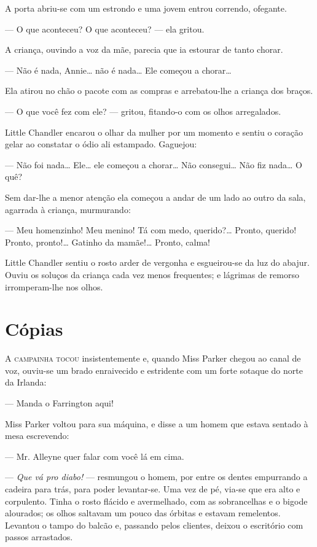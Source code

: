 A porta abriu-se com um estrondo e uma jovem entrou correndo,
ofegante.

--- O que aconteceu? O que aconteceu? --- ela gritou.

A criança, ouvindo a voz da mãe, parecia que ia estourar de tanto
chorar.

--- Não é nada, Annie\ldots{} não é nada\ldots{} Ele começou a chorar\ldots{}

Ela atirou no chão o pacote com as compras e arrebatou-lhe a criança
dos braços.

--- O que você fez com ele? --- gritou, fitando-o com os olhos
arregalados.

Little Chandler encarou o olhar da mulher por um momento e sentiu o
coração gelar ao constatar o ódio ali estampado. Gaguejou:

--- Não foi nada\ldots{} Ele\ldots{} ele começou a chorar\ldots{} Não consegui\ldots{} Não
fiz nada\ldots{} O quê?

Sem dar-lhe a menor atenção ela começou a andar de um lado ao outro da
sala, agarrada à criança, murmurando:

--- Meu homenzinho! Meu menino! Tá com medo, querido?\ldots{} Pronto,
querido! Pronto, pronto!\ldots{} Gatinho da mamãe!\ldots{} Pronto, calma!

Little Chandler sentiu o rosto arder de vergonha e esgueirou-se da luz
do abajur. Ouviu os soluços da criança cada vez menos frequentes; e
lágrimas de remorso irromperam-lhe nos olhos.

\chapter{Cópias}

\textsc{A campainha tocou} insistentemente e, quando Miss Parker chegou ao canal
de voz, ouviu-se um brado enraivecido e estridente com um forte
sotaque do norte da Irlanda:

--- Manda o Farrington aqui!

Miss Parker voltou para sua máquina, e disse a um homem que estava
sentado à mesa escrevendo:

--- Mr. Alleyne quer falar com você lá em cima.

--- \textit{Que vá pro diabo!} --- resmungou o homem, por entre os dentes
empurrando a cadeira para trás, para poder levantar-se. Uma vez de pé,
via-se que era alto e corpulento. Tinha o rosto flácido e avermelhado,
com as sobrancelhas e o bigode alourados; os olhos saltavam um pouco
das órbitas e estavam remelentos. Levantou o tampo do balcão e,
passando pelos clientes, deixou o escritório com passos arrastados.

